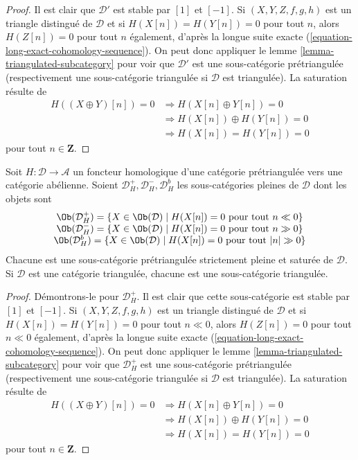 \begin{proof}
Il est clair que $\mathcal{D}'$ est stable par $[1]$ et $[-1]$.
Si $(X, Y, Z, f, g, h)$ est un triangle distingué de $\mathcal{D}$ et si
$H(X[n]) = H(Y[n]) = 0$ pour tout $n$, alors $H(Z[n]) = 0$ pour tout $n$
également, d'après la longue suite exacte
(\ref{equation-long-exact-cohomology-sequence}).
On peut donc appliquer le lemme \ref{lemma-triangulated-subcategory} pour voir
que $\mathcal{D}'$ est une sous-catégorie prétriangulée (respectivement une
sous-catégorie triangulée si $\mathcal{D}$ est triangulée).
La saturation résulte de
\begin{align*}
H((X \oplus Y)[n]) = 0 & \Rightarrow H(X[n] \oplus Y[n]) = 0 \\
& \Rightarrow H(X[n]) \oplus H(Y[n]) = 0 \\
& \Rightarrow H(X[n]) = H(Y[n]) = 0
\end{align*}
pour tout $n \in \mathbf{Z}$.
\end{proof}

\begin{lemma}
\label{lemma-homological-functor-bounded}
Soit $H : \mathcal{D} \to \mathcal{A}$ un foncteur homologique d'une catégorie
prétriangulée vers une catégorie abélienne.
Soient $\mathcal{D}_H^{+}, \mathcal{D}_H^{-}, \mathcal{D}_H^b$ les
sous-catégories pleines de $\mathcal{D}$ dont les objets sont
$$
\begin{matrix}
\Ob(\mathcal{D}_H^{+}) =
\{X \in \Ob(\mathcal{D}) \mid
H(X[n]) = 0\text{ pour tout }n \ll 0\} \\
\Ob(\mathcal{D}_H^{-}) =
\{X \in \Ob(\mathcal{D}) \mid
H(X[n]) = 0\text{ pour tout }n \gg 0\} \\
\Ob(\mathcal{D}_H^b) =
\{X \in \Ob(\mathcal{D}) \mid
H(X[n]) = 0\text{ pour tout }|n| \gg 0\}
\end{matrix}
$$
Chacune est une sous-catégorie prétriangulée strictement pleine et saturée de
$\mathcal{D}$. Si $\mathcal{D}$ est une catégorie triangulée, chacune est une
sous-catégorie triangulée.
\end{lemma}

\begin{proof}
Démontrons-le pour $\mathcal{D}_H^{+}$.
Il est clair que cette sous-catégorie est stable par $[1]$ et $[-1]$.
Si $(X, Y, Z, f, g, h)$ est un triangle distingué de $\mathcal{D}$ et si
$H(X[n]) = H(Y[n]) = 0$ pour tout $n \ll 0$, alors $H(Z[n]) = 0$ pour tout
$n \ll 0$ également, d'après la longue suite exacte
(\ref{equation-long-exact-cohomology-sequence}).
On peut donc appliquer le lemme \ref{lemma-triangulated-subcategory} pour voir
que $\mathcal{D}_H^{+}$ est une sous-catégorie prétriangulée (respectivement
une sous-catégorie triangulée si $\mathcal{D}$ est triangulée).
La saturation résulte de
\begin{align*}
H((X \oplus Y)[n]) = 0 & \Rightarrow H(X[n] \oplus Y[n]) = 0 \\
& \Rightarrow H(X[n]) \oplus H(Y[n]) = 0 \\
& \Rightarrow H(X[n]) = H(Y[n]) = 0
\end{align*}
pour tout $n \in \mathbf{Z}$.
\end{proof}

